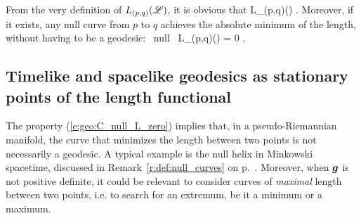 From the very definition of $L_{(p,q)}(\mathscr{L})$, it is obvious that
\be
    L_{(p,q)}(\Li)  .
\ee
Moreover, if it exists, any null curve from $p$ to $q$ achieves the
absolute minimum of the length, without having to be a geodesic:
\be \label{e:geo:C_null_L_zero}
    \Li\mbox{ null } \Longrightarrow L_{(p,q)}(\Li) = 0 .
\ee

\subsection{Timelike and spacelike geodesics as stationary points
of the length functional} \label{s:geo:variation_length}

The property (\ref{e:geo:C_null_L_zero}) implies that, in a pseudo-Riemannian
manifold, the curve that minimizes the length between two points is not necessarily
a geodesic. A typical example is the null helix in Minkowski spacetime, discussed in
Remark~\ref{r:def:null_curves} on p.~\pageref{r:def:null_curves}. Moreover,
when $\bm{g}$ is not positive definite, it could be relevant to consider curves
of \emph{maximal} length between two points, i.e. to search for an extremum,
be it a minimum or a maximum.

